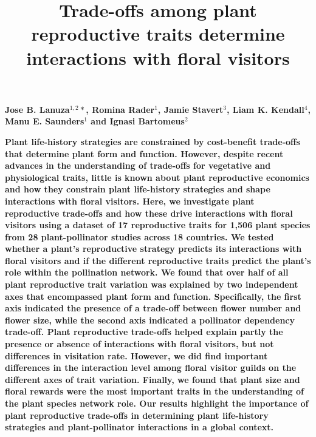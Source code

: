 \documentclass[
  12pt,
  a4paper,
]{article}
\title{\singlespacing \vspace{-1.6cm} \LARGE Trade-offs among plant reproductive traits determine interactions with floral visitors}
\author{}
\date{\vspace{-2.5em}}
\begin{document}
\maketitle

\vspace{-1.7cm}
\singlespacing
\large

\textbf{Jose B. Lanuza$^{1,2}*$, Romina Rader$^{1}$, Jamie Stavert$^{3}$, Liam K. Kendall$^{4}$, Manu E. Saunders$^{1}$ and Ignasi Bartomeus$^{2}$}

\vspace{0.3cm}

\normalsize

\textbf{Plant life-history strategies are constrained by cost-benefit trade-offs that determine plant form and function. However, despite recent advances in the understanding of trade-offs for vegetative and physiological traits, little is known about plant reproductive economics and how they constrain plant life-history strategies and shape interactions with floral visitors. Here, we investigate plant reproductive trade-offs and how these drive interactions with floral visitors using a dataset of 17 reproductive traits for 1,506 plant species from 28 plant-pollinator studies across 18 countries. We tested whether a plant's reproductive strategy predicts its interactions with floral visitors and if the different reproductive traits predict the plant's role within the pollination network. We found that over half of all plant reproductive trait variation was explained by two independent axes that encompassed plant form and function. Specifically, the first axis indicated the presence of a trade-off between flower number and flower size, while the second axis indicated a pollinator dependency trade-off. Plant reproductive trade-offs helped explain partly the presence or absence of interactions with floral visitors, but not differences in visitation rate. However, we did find important differences in the interaction level among floral visitor guilds on the different axes of trait variation. Finally, we found that plant size and floral rewards were the most important traits in the understanding of the plant species network role. Our results highlight the importance of plant reproductive trade-offs in determining plant life-history strategies and plant-pollinator interactions in a global context.}

\small
\vspace{-0.5cm}

\noindent
\end{document}
